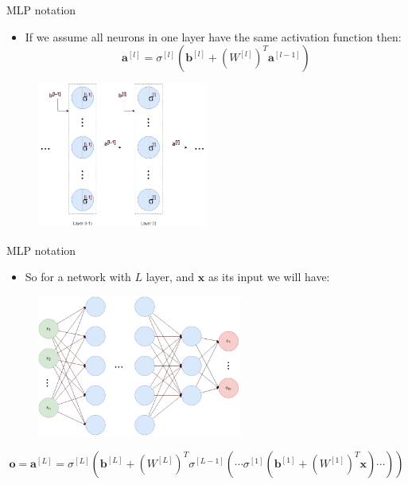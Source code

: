 \documentclass[compress,oilve,t]{beamer}
\begin{document}
\begin{frame}{MLP notation}
	\begin{itemize}
		\item If we assume all neurons in one layer have the same activation function then:
		\[
		\bm{a}^{[l]} = \sigma^{[l]}\left(\bm{b}^{[l]} +  (W^{[l]})^T\bm{a}^{[l-1]}\right)
		\]
	\end{itemize}
	\begin{figure}[H]
		\centering
		\includegraphics[width=0.5\textwidth]{Figs/notation5.png}
	\end{figure}
\end{frame}

\begin{frame}{MLP notation}
	\begin{itemize}
		\item So for a network with $L$ layer, and $\bm{x}$ as its input we will have:
	\end{itemize}
	\begin{figure}[H]
		\centering
		\includegraphics[width=0.6\textwidth]{Figs/notation6.png}
	\end{figure}
	\[
	\bm{o}=\bm{a}^{[L]}=\sigma^{[L]}\left(\bm{b}^{[L]} + (W^{[L]})^T\sigma^{[L-1]}\left(\cdots\sigma^{[1]}\left(\bm{b}^{[1]}+(W^{[1]})^T\bm{x}\right)\cdots \right)\right)
	\]
\end{frame}
\end{document}
